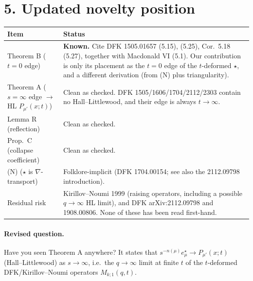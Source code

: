 \documentclass[10pt]{article}
\begin{document}
\section*{5. Updated novelty position}
\begin{center}
\begin{tabularx}{\textwidth}{@{}lY@{}}
\toprule
Item & Status\\
\midrule
Theorem B ($t=0$ edge) & \textbf{Known.} Cite DFK 1505.01657 (5.15), (5.25), Cor.~5.18 (5.27), together with Macdonald VI (5.1). Our contribution is only its placement as the $t=0$ edge of the $t$-deformed $\star$, and a different derivation (from (N) plus triangularity).\\
Theorem A ($s=\infty$ edge $\to$ HL $P_{\mu'}(x;t)$) & Clean as checked. DFK 1505/1606/1704/2112/2303 contain no Hall--Littlewood, and their edge is always $t\to\infty$.\\
Lemma R (reflection) & Clean as checked.\\
Prop.~C (collapse coefficient) & Clean as checked.\\
(N) ($\star$ is $\nabla$-transport) & Folklore-implicit (DFK 1704.00154; see also the 2112.09798 introduction).\\
\midrule
Residual risk & Kirillov--Noumi 1999 (raising operators, including a possible $q\to\infty$ HL limit), and DFK arXiv:2112.09798 and 1908.00806. None of these has been read first-hand.\\
\bottomrule
\end{tabularx}
\end{center}

\paragraph{Revised question.} Have you seen Theorem A anywhere? It states that $s^{-n(\mu)}e^\star_\mu\to P_{\mu'}(x;t)$ (Hall--Littlewood) as $s\to\infty$, i.e.\ the $q\to\infty$ limit at finite $t$ of the $t$-deformed DFK/Kirillov--Noumi operators $M_{k;1}(q,t)$.
\end{document}
